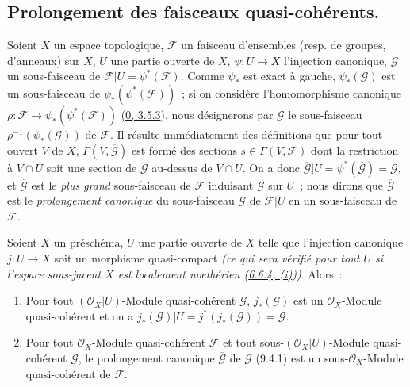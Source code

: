 
\subsection{Prolongement des faisceaux quasi-cohérents.}
\label{subsection:I.9.4-fr}

\begin{env}[9.4.1]
\label{I.9.4.1-fr}
Soient $X$ un espace topologique, $\mathscr{F}$ un faisceau d'ensembles
(resp. de groupes, d'anneaux) sur $X$, $U$ une partie ouverte de $X$,
$\psi:U\to X$ l'injection canonique, $\mathscr{G}$ un sous-faisceau de
$\mathscr{F}|U=\psi^*(\mathscr{F})$. Comme $\psi_*$ est exact à gauche,
$\psi_*(\mathscr{G})$ est un sous-faisceau de
$\psi_*(\psi^*(\mathscr{F}))$~; si on considère l'homomorphisme canonique
$\rho:\mathscr{F}\to\psi_*(\psi^*(\mathscr{F}))$
(\hyperref[0.3.5.3-fr]{0, 3.5.3}), nous désignerons par
$\overline{\mathscr{G}}$ le sous-faisceau
$\rho^{-1}(\psi_*(\mathscr{G}))$ de $\mathscr{F}$. Il résulte immédiatement
des définitions que pour tout ouvert $V$ de $X$,
$\Gamma(V,\overline{\mathscr{G}})$ est formé des sections
$s\in\Gamma(V,\mathscr{F})$ dont la restriction à $V\cap U$ soit une section
de $\mathscr{G}$ au-dessus de $V\cap U$. On a donc
$\overline{\mathscr{G}}|U=\psi^*(\overline{\mathscr{G}})=\mathscr{G}$, et
$\overline{\mathscr{G}}$ est le \emph{plus grand} sous-faisceau de
$\mathscr{F}$ induisant $\mathscr{G}$ sur $U$~; nous dirons que
$\overline{\mathscr{G}}$ est le \emph{prolongement canonique} du
sous-faisceau $\mathscr{G}$ de $\mathscr{F}|U$ en un sous-faisceau de
$\mathscr{F}$.
\end{env}

\begin{proposition}[9.4.2]
\label{I.9.4.2-fr}
Soient $X$ un préschéma, $U$ une partie ouverte de $X$ telle que l'injection
canonique $j:U\to X$ soit un morphisme quasi-compact
\emph{(ce qui sera vérifié pour \emph{tout} $U$ si l'espace sous-jacent $X$
est \emph{localement noethérien}
(\hyperref[I.6.6.4-fr]{6.6.4, (i)}))}. Alors~:
\begin{enumerate}
\item[(i)] Pour tout $(\mathscr{O}_X|U)$-Module quasi-cohérent
  $\mathscr{G}$, $j_*(\mathscr{G})$ est un $\mathscr{O}_X$-Module
  quasi-cohérent et on a
  $j_*(\mathscr{G})|U=j^*(j_*(\mathscr{G}))=\mathscr{G}$.
\item[(ii)] Pour tout $\mathscr{O}_X$-Module quasi-cohérent $\mathscr{F}$ et
  tout sous-$(\mathscr{O}_X|U)$-Module quasi-cohérent $\mathscr{G}$, le
  prolongement canonique $\overline{\mathscr{G}}$ de $\mathscr{G}$ (9.4.1)
  est un sous-$\mathscr{O}_X$-Module quasi-cohérent de $\mathscr{F}$.
\end{enumerate}
\end{proposition}

